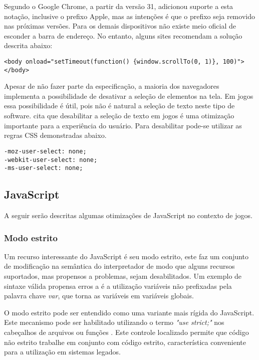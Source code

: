 Segundo \citet{homescreenwebapps} o Google Chrome, a partir da versão
31, adicionou suporte a esta notação, inclusive o prefixo Apple, mas
as intenções é que o prefixo seja removido nas próximas versões.
Para os demais dispositivos não existe meio oficial de esconder a
barra de endereço. No entanto, alguns sites recomendam a solução
descrita abaixo:

\begin{verbatim}
<body onload="setTimeout(function() {window.scrollTo(0, 1)}, 100)">
</body>
\end{verbatim}

Apesar de não fazer parte da especificação, a maioria dos navegadores
implementa a possibilidade de desativar a seleção de elementos na tela.
Em jogos essa possibilidade é útil, pois não é natural a seleção de texto
neste tipo de software. \citet{html5mostwanted} cita que desabilitar
a seleção de texto em jogos é uma otimização importante para a
experiência do usuário. Para desabilitar pode-se utilizar as regras
CSS demonstradas abaixo.

\begin{verbatim}
-moz-user-select: none;
-webkit-user-select: none;
-ms-user-select: none;
\end{verbatim}

\subsection{JavaScript}

A seguir serão descritas algumas otimizações de JavaScript no
contexto de jogos.

\subsubsection{Modo estrito}

Um recurso interessante do JavaScript é seu modo estrito, este faz
um conjunto de modificação na semântica do interpretador de modo
que alguns recursos suportados, mas propensos a problemas, sejam
desabilitados. Um exemplo de sintaxe válida propensa erros a é a
utilização variáveis não prefixadas pela palavra chave \textit{var},
que torna as variáveis em variáveis globais.

O modo estrito pode ser entendido como uma variante mais rígida do
JavaScript. Este mecanismo pode ser habilitado utilizando o termo
\textit{"use strict;"} nos cabeçalhos de arquivos ou funções .
Este controle localizado permite que código não estrito trabalhe
em conjunto com código estrito, característica conveniente para a
utilização em sistemas legados.

